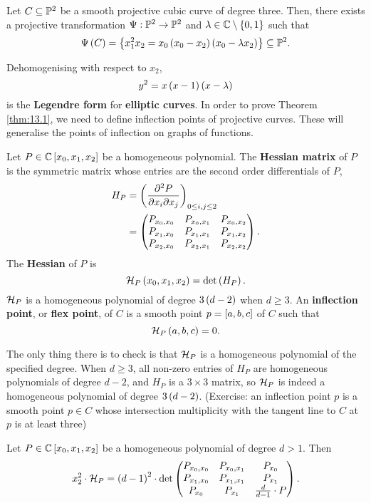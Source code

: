 \begin{theorem}
\label{thm:13.1}
Let $ C \subseteq \P^2 $ be a smooth projective cubic curve of degree three. Then, there exists a projective transformation $ \Psi : \P^2 \to \P^2 $ and $ \lambda \in \C \setminus \cb{0, 1} $ such that
$$ \Psi\rb{C} = \cb{x_1^2x_2 = x_0\rb{x_0 - x_2}\rb{x_0 - \lambda x_2}} \subseteq \P^2. $$
\end{theorem}

Dehomogenising with respect to $ x_2 $,
$$ y^2 = x\rb{x - 1}\rb{x - \lambda} $$
is the \textbf{Legendre form} for \textbf{elliptic curves}. In order to prove Theorem \ref{thm:13.1}, we need to define inflection points of projective curves. These will generalise the points of inflection on graphs of functions.

\begin{definition}
\label{def:13.2}
Let $ P \in \C\sb{x_0, x_1, x_2} $ be a homogeneous polynomial. The \textbf{Hessian matrix} of $ P $ is the symmetric matrix whose entries are the second order differentials of $ P $,
\begin{align*}
H_P
& = \rb{\dfrac{\partial^2 P}{\partial x_i \partial x_j}}_{0 \le i, j \le 2} \\
& = \threebythree{P_{x_0, x_0}}{P_{x_0, x_1}}{P_{x_0, x_2}}{P_{x_1, x_0}}{P_{x_1, x_1}}{P_{x_1, x_2}}{P_{x_2, x_0}}{P_{x_2, x_1}}{P_{x_2, x_2}}.
\end{align*}
The \textbf{Hessian} of $ P $ is
$$ \HH_P\rb{x_0, x_1, x_2} = \det\rb{H_P}. $$
$ \HH_P $ is a homogeneous polynomial of degree $ 3\rb{d - 2} $ when $ d \ge 3 $. An \textbf{inflection point}, or \textbf{flex point}, of $ C $ is a smooth point $ p = \sb{a, b, c} $ of $ C $ such that
$$ \HH_P\rb{a, b, c} = 0. $$
\end{definition}

The only thing there is to check is that $ \HH_P $ is a homogeneous polynomial of the specified degree. When $ d \ge 3 $, all non-zero entries of $ H_P $ are homogeneous polynomials of degree $ d - 2 $, and $ H_P $ is a $ 3 \times 3 $ matrix, so $ \HH_P $ is indeed a homogeneous polynomial of degree $ 3\rb{d - 2} $. (Exercise: an inflection point $ p $ is a smooth point $ p \in C $ whose intersection multiplicity with the tangent line to $ C $ at $ p $ is at least three)

\begin{lemma}
\label{lem:13.3}
Let $ P \in \C\sb{x_0, x_1, x_2} $ be a homogeneous polynomial of degree $ d > 1 $. Then
\begin{equation}
\label{eq:10}
x_2^2 \cdot \HH_P = \rb{d - 1}^2 \cdot \det\threebythree{P_{x_0, x_0}}{P_{x_0, x_1}}{P_{x_0}}{P_{x_1, x_0}}{P_{x_1, x_1}}{P_{x_1}}{P_{x_0}}{P_{x_1}}{\tfrac{d}{d - 1} \cdot P}.
\end{equation}
\end{lemma}


